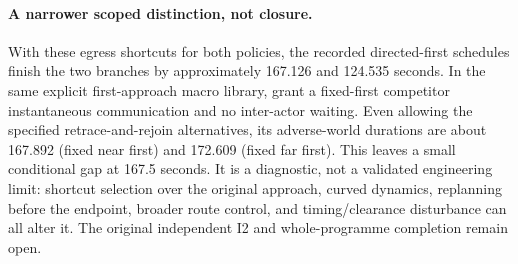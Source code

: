 \documentclass{article}
\begin{document}
\paragraph{A narrower scoped distinction, not closure.}
With these egress shortcuts for both policies, the recorded
directed-first schedules finish the two branches by
approximately 167.126 and 124.535 seconds. In the same explicit
first-approach macro library, grant a fixed-first competitor
instantaneous communication and no inter-actor waiting.
Even allowing the specified retrace-and-rejoin alternatives,
its adverse-world durations are about 167.892
(fixed near first) and 172.609 (fixed far first).
This leaves a small conditional gap at 167.5 seconds.
It is a diagnostic, not a validated engineering limit: shortcut
selection over the original approach, curved dynamics,
replanning before the endpoint, broader route control,
and timing/clearance disturbance can all alter it.
The original independent I2 and whole-programme completion
remain open.
\end{document}
